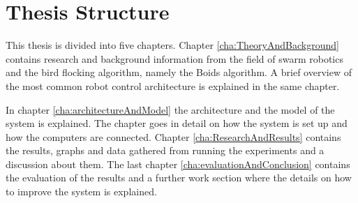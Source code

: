 

\section{Thesis Structure}
\label{sec:thesisStructure}
This thesis is divided into five chapters. Chapter \ref{cha:TheoryAndBackground} contains research and background information from the field of swarm robotics and the bird flocking algorithm, namely the Boids algorithm. A brief overview of the most common robot control architecture is explained in the same chapter.

In chapter \ref{cha:architectureAndModel} the architecture and the model of the system is explained. The chapter goes in detail on how the system is set up and how the computers are connected.
Chapter \ref{cha:ResearchAndResults} contains the results, graphs and data gathered from running the experiments and a discussion about them. The last chapter \ref{cha:evaluationAndConclusion} contains the evaluation of the results and a further work section where the details on how to improve the system is explained.

